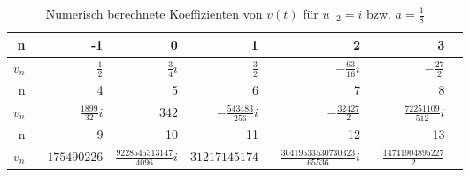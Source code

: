 \begin{table}[H] %
\begin{center}
\begin{tabular}{|r||r|r|r|r|r|r|}
\hline
\cellcolor{gray!50} n \rowcolor{gray!20}
&-1 &0 &1 &2 &3
\\ \hline
\cellcolor{gray!50} $v_n$
& $\frac{1}{2}$
& $\frac{3}{4}i$
& $\frac{3}{2}$
& $-\frac{63}{16}i$
& $-\frac{27}{2}$
\\\hline
\hline
\cellcolor{gray!50} n \rowcolor{gray!20}
& 4 & 5 & 6 & 7 & 8
\\ \hline
\cellcolor{gray!50} $v_n$
& $\frac{1899}{32}i$
& $342$
& $-\frac{543483}{256}i$
& $-\frac{32427}{2}$
& $\frac{72251109}{512}i$
\\\hline
\hline
\cellcolor{gray!50} n \rowcolor{gray!20}
& 9 & 10 & 11 & 12 & 13
\\ \hline
\cellcolor{gray!50} $v_n$
& $-175490226$
& $\frac{9228545313147}{4096}i$
& $31217145174$
& $-\frac{30419533530730323}{65536}i$
& $-\frac{14741904895227}{2}$
\\\hline
\end{tabular}
\caption{Numerisch berechnete Koeffizienten von $v(t)$ für $u_{-2}=i$ bzw.
  $a=\frac{1}{8}$}
\label{tab:koeff_a=0.125}
\end{center}
\end{table}


